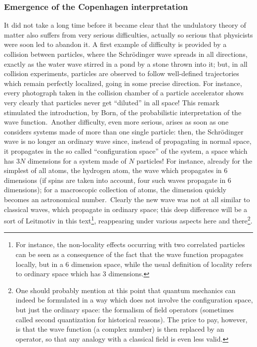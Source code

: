 \documentclass[12pt,onecolumn]{article}%
\begin{document}
\subsubsection{Emergence of the Copenhagen interpretation}

\label{Cop}

It did not take a long time before it became clear that the undulatory theory
of matter also suffers from very serious difficulties, actually so serious
that physicists were soon led to abandon it. A first example of difficulty is
provided by a collision between particles, where the Schr\"{o}dinger wave
spreads in all directions, exactly as the water wave stirred in a pond by a
stone thrown into it; but, in all collision experiments, particles are
observed to follow well-defined trajectories which remain perfectly localized,
going in some precise direction. For instance, every photograph taken in the
collision chamber of a particle accelerator shows very clearly that particles
never get ``diluted'' in all space! This remark stimulated the introduction,
by Born, of the probabilistic interpretation of the wave function.\ Another
difficulty, even more serious, arises as soon as one considers systems made of
more than one single particle: then, the Schr\"{o}dinger wave is no longer an
ordinary wave since, instead of propagating in normal space, it propagates in
the so called ``configuration space'' of the system, a space which has $3N$
dimensions for a system made of $N$ particles! For instance, already for the
simplest of all atoms, the hydrogen atom, the wave which propagates in $6$
dimensions (if spins are taken into account, four such waves propagate in 6
dimensions); for a macroscopic collection of atoms, the dimension quickly
becomes an astronomical number.\ Clearly the new wave was not at all similar
to classical waves, which propagate in ordinary space; this deep difference
will be a sort of Leitmotiv in this text\footnote{For instance, the
non-locality effects occurring with two correlated particles can be seen as a
consequence of the fact that the wave function propagates locally, but in a
$6$ dimension space, while the usual definition of locality refers to ordinary
space which has $3$ dimensions.}, reappearing under various aspects here and
there\footnote{One should probably mention at this point that quantum
mechanics can indeed be formulated in a way which does not involve the
configuration space, but just the ordinary space: the formalism of field
operators (sometimes called second quantization for historical reasons). The
price to pay, however, is that the wave function (a complex number) is then
replaced by an operator, so that any analogy with a classical field is even
less valid.}.
\end{document}
